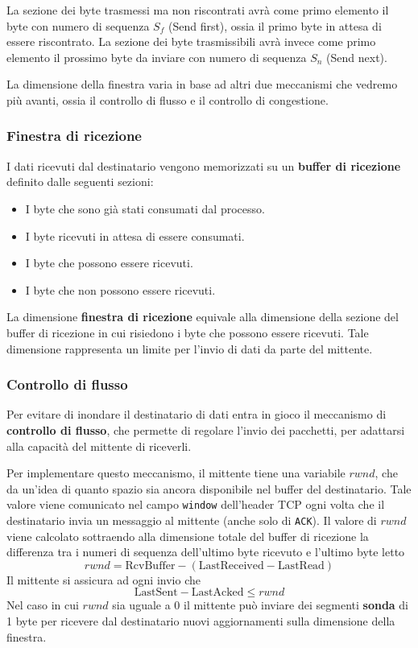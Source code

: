 La sezione dei byte trasmessi ma non riscontrati avrà come primo 
elemento il byte con numero di sequenza $S_f$ (Send first), ossia il 
primo byte in attesa di essere riscontrato. La sezione dei byte 
trasmissibili avrà invece come primo elemento il prossimo byte da 
inviare con numero di sequenza $S_n$ (Send next).

La dimensione della finestra varia in base ad altri due meccanismi che 
vedremo più avanti, ossia il controllo di flusso e il controllo di 
congestione.

\subsubsection{Finestra di ricezione}
I dati ricevuti dal destinatario vengono memorizzati su un 
\textbf{buffer di ricezione} definito dalle seguenti sezioni:
\begin{itemize}
	\item I byte che sono già stati consumati dal processo.
	\item I byte ricevuti in attesa di essere consumati.
	\item I byte che possono essere ricevuti.
	\item I byte che non possono essere ricevuti.
\end{itemize}
La dimensione \textbf{finestra di ricezione} equivale alla dimensione 
della sezione del buffer di ricezione in cui risiedono i byte che 
possono essere ricevuti. Tale dimensione rappresenta un limite per 
l'invio di dati da parte del mittente.

\subsubsection{Controllo di flusso}
Per evitare di inondare il destinatario di dati entra in gioco il 
meccanismo di \textbf{controllo di flusso}, che permette di regolare 
l'invio dei pacchetti, per adattarsi alla capacità del mittente di 
riceverli.

Per implementare questo meccanismo, il mittente tiene una variabile 
$rwnd$, che da un'idea di quanto spazio sia ancora disponibile nel 
buffer del destinatario. Tale valore viene comunicato nel campo 
\verb|window| dell'header TCP ogni volta che il destinatario invia un
messaggio al mittente (anche solo di \verb|ACK|). Il valore di $rwnd$ 
viene calcolato sottraendo alla dimensione totale del buffer di 
ricezione la differenza tra i numeri di sequenza dell'ultimo byte 
ricevuto e l'ultimo byte letto
\[
	rwnd = \text{RcvBuffer} - (\text{LastReceived} - \text{LastRead})
\]
Il mittente si assicura ad ogni invio che
\[ \text{LastSent} - \text{LastAcked} \leq rwnd \]
Nel caso in cui $rwnd$ sia uguale a 0 il mittente può inviare dei 
segmenti \textbf{sonda} di 1 byte per ricevere dal destinatario nuovi 
aggiornamenti sulla dimensione della finestra.

